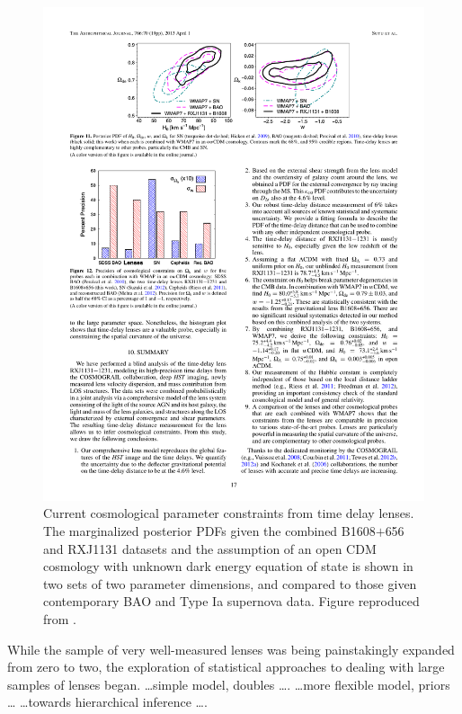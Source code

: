 \begin{figure}[!ht]
\centering\includegraphics[width=0.9\linewidth]{figures/Suyu13_fig11.pdf}
\caption{Current cosmological parameter constraints from time delay
lenses. The marginalized posterior PDFs given the combined B1608$+$656
and RXJ1131 datasets and the assumption of an open CDM cosmology with
unknown dark energy equation of state is shown in
two sets of two parameter dimensions,
and compared to those given contemporary BAO and Type Ia supernova data.
Figure reproduced from \citet{Suy++14}.}
\label{fig:current-constraints}
\end{figure}

While the sample of very well-measured lenses was being painstakingly
expanded from zero to two,  the exploration of statistical approaches to
dealing with large samples of lenses began. \citet{Ogu07b} \ldots simple model, doubles \ldots.
\citep{Rea++07} \ldots more flexible model, priors \ldots
\citet{RK++2015} \ldots towards hierarchical inference \ldots.
